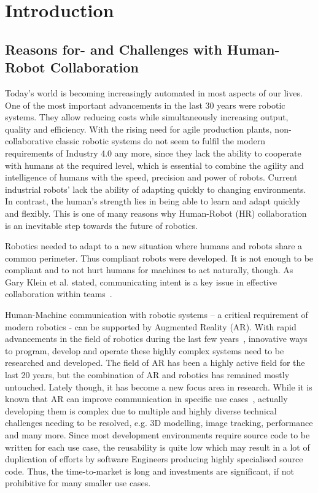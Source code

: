 \chapter{Introduction}\label{Chap:Introduction}

\section{Reasons for- and Challenges with Human-Robot Collaboration}\label{Section:ProblemDescription}

Today’s world is becoming increasingly automated in most aspects of our lives. One of the most important advancements in the last 30 years were robotic systems. They allow reducing costs while simultaneously increasing output, quality and efficiency. With the rising need for agile production plants, non-collaborative classic robotic systems do not seem to fulfil the modern requirements of Industry 4.0 any more, since they lack the ability to cooperate with humans at the required level, which is essential to combine the agility and intelligence of humans with the speed, precision and  power of robots. Current industrial robots’ lack the ability  of adapting quickly to changing environments. In contrast, the human’s strength lies in being able to learn and adapt quickly and flexibly. This is one of many reasons why Human-Robot (HR) collaboration is an inevitable step towards the future of robotics.

Robotics needed to adapt to a new situation where humans and robots share a common perimeter. Thus compliant robots were developed. It is not enough to be compliant and to not hurt humans for machines to act naturally, though. As Gary Klein et al. stated, communicating intent is a key issue in effective collaboration within teams~\cite{klein2005common}. 

Human-Machine communication with robotic systems – a critical requirement of modern robotics -  can be supported by Augmented Reality (AR). With rapid advancements in the field of robotics during the last few years~\cite{laschi2016soft}, innovative ways to program, develop and operate these highly complex systems need to be researched and developed. The field of AR has been a highly active field for the last 20 years, but the combination of AR and robotics has remained mostly untouched. Lately though, it has become a new focus area in research. While it is known that AR can improve communication in specific use cases~\cite{ARCommunicationBenefits}, actually developing them is complex due to multiple and highly diverse technical challenges needing to be resolved, e.g. 3D modelling, image tracking, performance and many more. Since most development environments require source code to be written for each use case, the reusability is quite low which may result in a lot of duplication of efforts by software Engineers producing highly specialised source code. Thus, the time-to-market is long and investments are significant, if not prohibitive for many smaller use cases.

